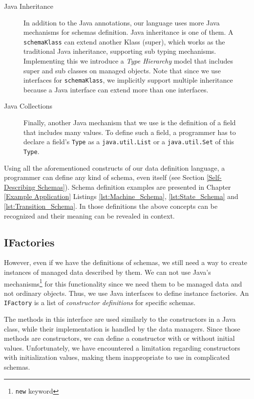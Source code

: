 \begin{description}
	\item [Java Inheritance] In addition to the Java annotations, our language uses more Java mechanisms for schemas definition. 
	Java inheritance is one of them. 
	A \texttt{schemaKlass} can extend another Klass (super), which works as the traditional Java inheritance, supporting sub typing mechanisms.
	Implementing this we introduce a \textit{Type Hierarchy} model that includes super and sub classes on managed objects.
	Note that since we use interfaces for \texttt{schemaKlass}, we implicitly support multiple inheritance because a Java interface can extend more than one interfaces.

	\item [Java Collections] Finally, another Java mechanism that we use is the definition of a field that includes many values.
	To define such a field, a programmer has to declare a field's \texttt{Type} as a \texttt{java.util.List} or a \texttt{java.util.Set} of this \texttt{Type}.

\end{description}

Using all the aforementioned constructs of our data definition language, a programmer can define any kind of schema, even itself (see Section \ref{Self-Describing Schemas}).
Schema definition examples are presented in Chapter \ref{Example Application} Listings \ref{lst:Machine_Schema}, \ref{lst:State_Schema} and \ref{lst:Transition_Schema}.
In those definitions the above concepts can be recognized and their meaning can be revealed in context.

\subsection{IFactories}\label{IFactories}
However, even if we have the definitions of schemas, we still need a way to create instances of managed data described by them.
We can not use Java's mechanisms\footnote{\texttt{new} keyword} for this functionality since we need them to be managed data and not ordinary objects.
Thus, we use Java interfaces to define instance factories.
An \texttt{IFactory} is a list of \textit{constructor definitions} for specific schemas.

The methods in this interface are used similarly to the constructors in a Java class, while their implementation is handled by the data managers.
Since those methods are constructors, we can define a constructor with or without initial values.
Unfortunately, we have encountered a limitation regarding constructors with initialization values, making them inappropriate to use in complicated schemas.

